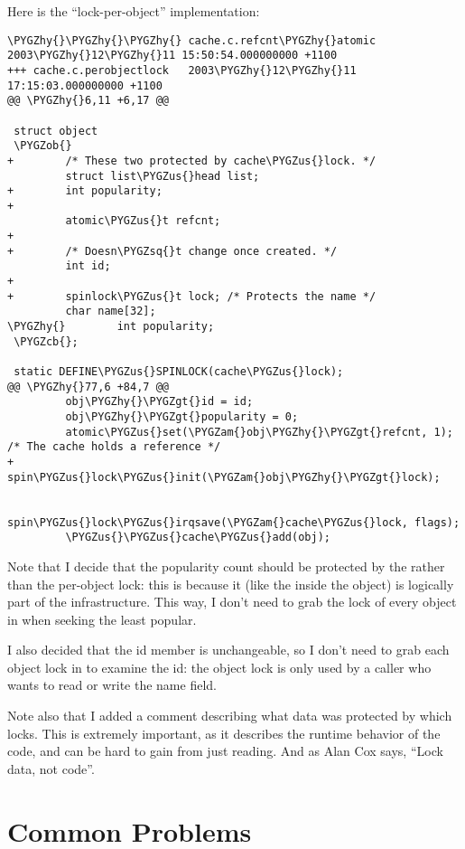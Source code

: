 \documentclass[a4paper,8pt,english]{sphinxmanual}
\def\PYGZus{\char`\_}
\def\PYGZob{\char`\{}
\def\PYGZcb{\char`\}}
\def\PYGZam{\char`\&}
\def\PYGZgt{\char`\>}
\def\PYGZhy{\char`\-}
\def\PYGZsq{\char`\'}
\renewcommand\PYGZsq{\textquotesingle}
\begin{document}
Here is the ``lock-per-object'' implementation:

\begin{Verbatim}[commandchars=\\\{\}]
\PYGZhy{}\PYGZhy{}\PYGZhy{} cache.c.refcnt\PYGZhy{}atomic   2003\PYGZhy{}12\PYGZhy{}11 15:50:54.000000000 +1100
+++ cache.c.perobjectlock   2003\PYGZhy{}12\PYGZhy{}11 17:15:03.000000000 +1100
@@ \PYGZhy{}6,11 +6,17 @@

 struct object
 \PYGZob{}
+        /* These two protected by cache\PYGZus{}lock. */
         struct list\PYGZus{}head list;
+        int popularity;
+
         atomic\PYGZus{}t refcnt;
+
+        /* Doesn\PYGZsq{}t change once created. */
         int id;
+
+        spinlock\PYGZus{}t lock; /* Protects the name */
         char name[32];
\PYGZhy{}        int popularity;
 \PYGZcb{};

 static DEFINE\PYGZus{}SPINLOCK(cache\PYGZus{}lock);
@@ \PYGZhy{}77,6 +84,7 @@
         obj\PYGZhy{}\PYGZgt{}id = id;
         obj\PYGZhy{}\PYGZgt{}popularity = 0;
         atomic\PYGZus{}set(\PYGZam{}obj\PYGZhy{}\PYGZgt{}refcnt, 1); /* The cache holds a reference */
+        spin\PYGZus{}lock\PYGZus{}init(\PYGZam{}obj\PYGZhy{}\PYGZgt{}lock);

         spin\PYGZus{}lock\PYGZus{}irqsave(\PYGZam{}cache\PYGZus{}lock, flags);
         \PYGZus{}\PYGZus{}cache\PYGZus{}add(obj);
\end{Verbatim}

Note that I decide that the popularity count should be protected by the
 rather than the per-object lock: this is because it (like
the  inside the object)
is logically part of the infrastructure. This way, I don't need to grab
the lock of every object in  when seeking
the least popular.

I also decided that the id member is unchangeable, so I don't need to
grab each object lock in  to examine the
id: the object lock is only used by a caller who wants to read or write
the name field.

Note also that I added a comment describing what data was protected by
which locks. This is extremely important, as it describes the runtime
behavior of the code, and can be hard to gain from just reading. And as
Alan Cox says, “Lock data, not code”.


\section{Common Problems}
\label{kernel-hacking/locking:common-problems}
\end{document}
